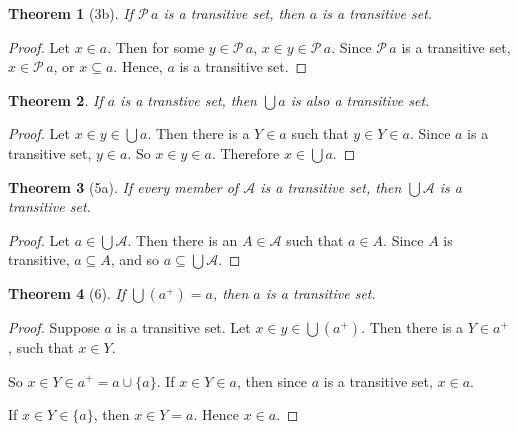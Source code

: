 \documentclass[12pt]{article}
\theoremstyle{plain}
\newtheorem*{exthm}{Theorem}
\theoremstyle{remark}
\theoremstyle{definition}
\theoremstyle{remark}
\newcommand{\powerset}{\mathscr{P}\,}
\begin{document}
\begin{exthm}[3b]
  If $\powerset a$ is a transitive set, then $a$ is a transitive set.
\end{exthm}
\begin{proof}
  Let $x \in a$. Then for some $y \in \powerset a$, $x \in y \in \powerset a$. Since $\powerset a$ is a transitive set, $x \in \powerset a$, or $x \subseteq a$. Hence, $a$ is a transitive set.
\end{proof}

\begin{exthm}
  If $a$ is a transtive set, then $\bigcup a$ is also a transitive set.
\end{exthm}
\begin{proof}
  Let $x \in y \in \bigcup a$. Then there is a $Y \in a$ such that $y \in Y \in a$. Since $a$ is a transitive set, $y \in a$. So $x \in y \in a$. Therefore $x \in \bigcup a$.
\end{proof}

\begin{exthm}[5a]
  If every member of $\mathscr{A}$ is a transitive set, then $\bigcup \mathscr{A}$ is a transitive set.
\end{exthm}
\begin{proof}
  Let $a \in \bigcup \mathscr{A}$. Then there is an $A \in \mathscr{A}$ such that $a \in A$. Since $A$ is transitive, $a \subseteq A$, and so $a \subseteq \bigcup \mathscr{A}$.
\end{proof}

\begin{exthm}[6]
  If $\bigcup(a^+) = a$, then $a$ is a transitive set.
\end{exthm}
\begin{proof}
  Suppose $a$ is a transitive set. Let $x \in y \in \bigcup(a^+)$. Then there is a $Y \in a^+$, such that $x \in Y$.

  So $x \in Y \in a^+ = a \cup \{a\}$. If $x \in Y \in a$, then since $a$ is a transitive set, $x \in a$.

  If $x \in Y \in \{a\}$, then $x \in Y = a$. Hence $x \in a$.


\end{proof}
\end{document}
